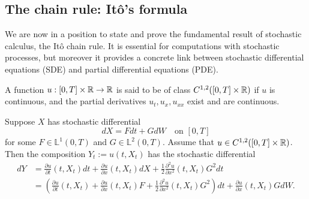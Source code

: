\subsection{The chain rule: It\^{o}'s formula}

We are now in a position to state and prove the fundamental result of stochastic calculus, the It\^{o} chain rule. It is essential for computations with stochastic processes, but moreover it provides a concrete link between stochastic differential equations (SDE) and partial differential equations (PDE).

A function $u:[0,T]\times\mathbb{R}\to\mathbb{R}$ is said to be of class $C^{1,2}([0,T]\times\mathbb{R})$ if $u$ is continuous, and the partial derivatives $u_t, u_x, u_{xx}$ exist and are continuous.
\begin{theorem}
    Suppose $X$ has stochastic differential
    \begin{equation*}
        dX = Fdt + GdW \quad\text{on } [0,T]
    \end{equation*}
    for some $F\in\mathbb{L}^1(0,T)$ and $G\in\mathbb{L}^2(0,T)$. Assume that $u\in C^{1,2}([0,T]\times\mathbb{R})$. Then the composition $Y_t:= u(t,X_t)$ has the stochastic differential
    \begin{equation}
    \label{eq:ito-chain}
    \begin{aligned}
        dY &= \frac{\partial u}{\partial t}(t,X_t) dt + \frac{\partial u}{\partial x}(t,X_t) dX + \frac{1}{2}\frac{\partial^2 u}{\partial x^2}(t,X_t) G^2dt \\
        &= \left(\frac{\partial u}{\partial t}(t,X_t) + \frac{\partial u}{\partial x}(t,X_t) F + \frac{1}{2}\frac{\partial^2 u}{\partial x^2}(t,X_t) G^2\right)dt + \frac{\partial u}{\partial x}(t,X_t) GdW.
    \end{aligned}
    \end{equation}
\end{theorem}

